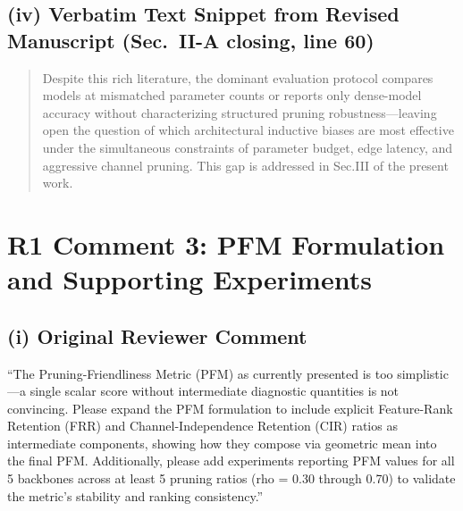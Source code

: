 \documentclass[conference]{IEEEtran}
\begin{document}
\subsection*{(iv) Verbatim Text Snippet from Revised Manuscript (Sec.~II-A closing, line 60)}
\begin{quote}
Despite this rich literature, the dominant evaluation protocol compares models at mismatched parameter counts or reports only dense-model accuracy without characterizing structured pruning robustness—leaving open the question of which architectural inductive biases are most effective under the simultaneous constraints of parameter budget, edge latency, and aggressive channel pruning. This gap is addressed in Sec.III of the present work.
\end{quote}

\section*{R1 Comment 3: PFM Formulation and Supporting Experiments}

\subsection*{(i) Original Reviewer Comment}
``The Pruning-Friendliness Metric (PFM) as currently presented is too simplistic—a single scalar score without intermediate diagnostic quantities is not convincing. Please expand the PFM formulation to include explicit Feature-Rank Retention (FRR) and Channel-Independence Retention (CIR) ratios as intermediate components, showing how they compose via geometric mean into the final PFM. Additionally, please add experiments reporting PFM values for all 5 backbones across at least 5 pruning ratios (rho = 0.30 through 0.70) to validate the metric's stability and ranking consistency.''
\end{document}
